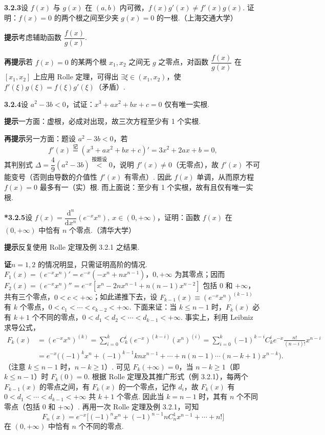 \documentclass[UTF8, 12pt, fontset=fandol, oneside]{ctexart}
\begin{document}
\noindent\textbf{3.2.3}\quad 设 $f(x)$ 与 $g(x)$ 在 $(a,b)$ 内可微，$f(x)g'(x)\ne f'(x)g(x)$. 证明：$f(x)=0$ 的两个根之间至少夹 $g(x)=0$ 的一根.（上海交通大学）

\noindent\textbf{提示}\quad 考虑辅助函数 $\dfrac{f(x)}{g(x)}$.

\noindent\textbf{再提示}\quad 若 $f(x)=0$ 的某两个根 $x_1,x_2$ 之间无 $g$ 之零点，对函数 $\dfrac{f(x)}{g(x)}$ 在 $[x_1,x_2]$ 上应用 Rolle 定理，可得出 $\exists \xi\in(x_1,x_2)$，使 $f'(\xi)g(\xi)=f(\xi)g'(\xi)$（矛盾）.

\noindent\textbf{3.2.4}\quad 设 $a^2-3b<0$，试证：$x^3+ax^2+bx+c=0$ 仅有唯一实根.

\noindent\textbf{提示}\quad 一方面：虚根，必成对出现，故三次方程至少有 1 个实根.

\noindent\textbf{再提示}\quad 另一方面：题设 $a^2-3b<0$，若
\[
  f'(x)\overset{\text{记}}{=}(x^3+ax^2+bx+c)'=3x^2+2ax+b=0,
\]
其判别式 $\Delta=\dfrac49(a^2-3b)\overset{\text{按题设}}{<}0$，说明 $f'(x)\ne0$（无零点），故 $f'(x)$ 不可能变号（否则由导数的介值性 $f'(x)$ 有零点）. 因此 $f(x)$ 单调，从而原方程 $f(x)=0$ 最多有一（实）根. 而上面说：至少有 1 个实根，故有且仅有唯一实根.

\noindent\textbf{*3.2.5}\quad 设 $f(x)=\dfrac{\mathrm d^n}{\mathrm dx^n}(e^{-x}x^n),\ x\in(0,+\infty)$，证明：函数 $f(x)$ 在 $(0,+\infty)$ 中恰有 $n$ 个零点.（清华大学）

\noindent\textbf{提示}\quad 反复使用 Rolle 定理及例 3.2.1 之结果.

\noindent\textbf{证}\quad $n=1,2$ 的情况明显，只需证明高阶的情况. $F_1(x)=(e^{-x}x^n)'=e^{-x}(-x^n+nx^{n-1})$，$0,+\infty$ 为其零点；因而 $F_2(x)=(e^{-x}x^n)''=e^{-x}[x^n-2nx^{n-1}+n(n-1)x^{n-2}]$ 包括 0 和 $+\infty$，共有三个零点，$0<c<+\infty$；如此递推下去，设 $F_{k-1}(x)\equiv(e^{-x}x^n)^{(k-1)}$ 有 $k$ 个零点，$0<c_1<\cdots<c_{k-2}<+\infty$. 下面来证：当 $k\le n-1$ 时，$F_k(x)$ 必有 $k+1$ 个不同的零点，$0<d_1<d_2<\cdots<d_{k-1}<+\infty$. 事实上，利用 Leibniz 求导公式，
\[
\begin{aligned}
F_k(x)
&=(e^{-x}x^n)^{(k)}
=\sum_{i=0}^k C_k^i(e^{-x})^{(k-i)}(x^n)^{(i)}
=\sum_{i=0}^k(-1)^{k-i}C_k^i e^{-x}\frac{n!}{(n-i)!}x^{n-i}\\
&=e^{-x}\bigl((-1)^k x^n+(-1)^{k-1}knx^{n-1}+\cdots+n(n-1)\cdots(n-k+1)x^{n-k}\bigr).
\end{aligned}
\]
（注意 $k\le n-1$ 时，$n-k\ge1$）. 可见 $F_k(+\infty)=0$，当 $n-k\ge1$（即 $k\le n-1$）时 $F_k(0)=0$. 根据 Rolle 定理及其推广形式（例 3.2.1），每两个 $F_{k-1}(x)$ 的零点之间，有 $F_k(x)$ 的一个零点，记作 $d_i$，故 $F_k(x)$ 有 $0<d_1<\cdots<d_{k-1}<+\infty$ 共 $k+1$ 个零点. 因此当 $k=n-1$ 时，其有 $n$ 个不同零点（包括 0 和 $+\infty$）. 再用一次 Rolle 定理及例 3.2.1，可知
\[
  F_n(x)=e^{-x}\bigl[(-1)^n x^n+(-1)^{n-1}nC_n^1x^{n-1}+\cdots+n!\bigr]
\]
在 $(0,+\infty)$ 中恰有 $n$ 个不同的零点.
\end{document}

